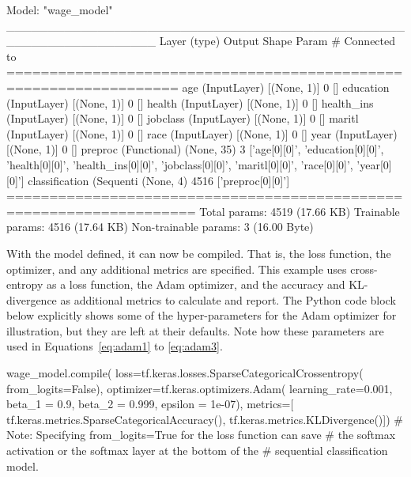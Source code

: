 \begin{samepage}
\begin{textcode}
Model: "wage_model"
__________________________________________________________________
 Layer (type)             Output Shape  Param # Connected to                  
==================================================================
 age (InputLayer)         [(None, 1)]   0       []                            
 education (InputLayer)   [(None, 1)]   0       []                            
 health (InputLayer)      [(None, 1)]   0       []                            
 health_ins (InputLayer)  [(None, 1)]   0       []                            
 jobclass (InputLayer)    [(None, 1)]   0       []                            
 maritl (InputLayer)      [(None, 1)]   0       []                            
 race (InputLayer)        [(None, 1)]   0       []                            
 year (InputLayer)        [(None, 1)]   0       []                            
 preproc (Functional)     (None, 35)    3       ['age[0][0]',                 
                                                 'education[0][0]',           
                                                 'health[0][0]',              
                                                 'health_ins[0][0]',          
                                                 'jobclass[0][0]',            
                                                 'maritl[0][0]',              
                                                 'race[0][0]',                
                                                 'year[0][0]']                
 classification (Sequenti (None, 4)     4516    ['preproc[0][0]']           
====================================================================
Total params: 4519 (17.66 KB)
Trainable params: 4516 (17.64 KB)
Non-trainable params: 3 (16.00 Byte)
\end{textcode}
\end{samepage}

With the model defined, it can now be compiled. That is, the loss function, the optimizer, and any additional metrics are specified. This example uses cross-entropy as a loss function, the Adam optimizer, and the accuracy and KL-divergence as additional metrics to calculate and report. The Python code block below explicitly shows some of the hyper-parameters for the Adam optimizer for illustration, but they are left at their defaults. Note how these parameters are used in Equations~\ref{eq:adam1} to \ref{eq:adam3}.

\begin{samepage}
\begin{pythoncode}
wage_model.compile(
    loss=tf.keras.losses.SparseCategoricalCrossentropy(
       from_logits=False),
    optimizer=tf.keras.optimizers.Adam(
        learning_rate=0.001,
        beta_1 = 0.9,
        beta_2 = 0.999,
        epsilon = 1e-07),
    metrics=[
        tf.keras.metrics.SparseCategoricalAccuracy(), 
        tf.keras.metrics.KLDivergence()])
# Note: Specifying from_logits=True for the loss function can save 
# the softmax activation or the softmax layer at the bottom of the 
# sequential classification model.
\end{pythoncode}
\end{samepage}

